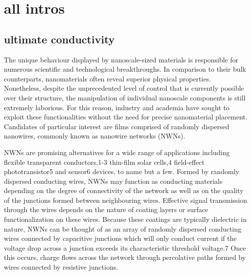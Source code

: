 \chapter{all intros}
\section{ultimate conductivity}
The unique behaviour displayed by nanoscale-sized materials is responsible for numerous scientific and technological breakthroughs. In comparison to their bulk counterparts, nanomaterials often reveal superior physical properties. Nonetheless, despite the unprecedented level of control that is currently possible over their structure, the manipulation of individual nanoscale components is still extremely laborious. For this reason, industry and academia have sought to exploit these functionalities without the need for precise nanomaterial placement. Candidates of particular interest are films comprised of randomly dispersed nanowires, commonly known as nanowire networks (NWNs).

NWNs are promising alternatives for a wide range of applications including flexible transparent conductors,1-3 thin-film solar cells,4 field-effect phototransistor5 and sensor6 devices, to name but a few. Formed by randomly dispersed conducting wires, NWNs may function as conducting materials depending on the degree of connectivity of the network as well as on the quality of the junctions formed between neighbouring wires. Effective signal transmission through the wires depends on the nature of coating layers or surface functionalization on these wires. Because these coatings are typically dielectric in nature, NWNs can be thought of as an array of randomly dispersed conducting wires connected by capacitive junctions which will only conduct current if the voltage drop across a junction exceeds its characteristic threshold voltage.7 Once this occurs, charge flows across the network through percolative paths formed by wires connected by resistive junctions.

